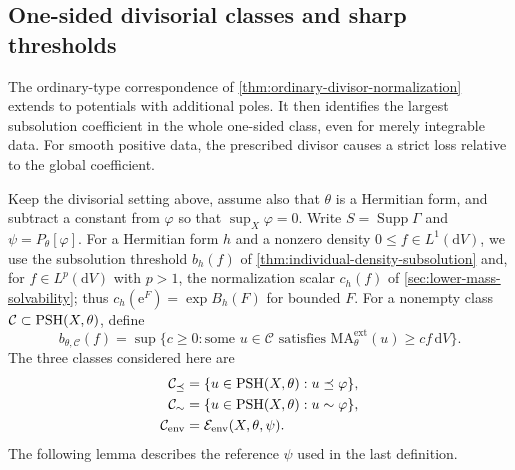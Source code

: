 \subsection{One-sided divisorial classes and sharp thresholds}
\label{subsec:divisorial-type-thresholds}

The ordinary-type correspondence of \cref{thm:ordinary-divisor-normalization} extends to potentials with additional poles. It then identifies the largest subsolution coefficient in the whole one-sided class, even for merely integrable data. For smooth positive data, the prescribed divisor causes a strict loss relative to the global coefficient.

Keep the divisorial setting above, assume also that $\theta$ is a Hermitian form, and subtract a constant from $\varphi$ so that $\sup_X\varphi=0$. Write $S=\operatorname{Supp}\Gamma$ and $\psi=P_\theta[\varphi]$. For a Hermitian form $h$ and a nonzero density $0\le f\in L^1(\mathrm dV)$, we use the subsolution threshold $b_h(f)$ of \cref{thm:individual-density-subsolution} and, for $f\in L^p(\mathrm dV)$ with $p>1$, the normalization scalar $c_h(f)$ of \cref{sec:lower-mass-solvability}; thus $c_h(\mathrm e^F)=\exp B_h(F)$ for bounded $F$. For a nonempty class $\mathcal C\subset\mathrm{PSH}(X,\theta)$, define
\[
 b_{\theta,\mathcal C}(f)=\sup\{c\ge0:\text{some }u\in\mathcal C
          \text{ satisfies }\mathrm{MA}^{\mathrm{ext}}_\theta(u)
                                      \ge cf\,\mathrm dV\}.
\]
The three classes considered here are
\[
 \begin{aligned}
 \mathcal C_{\preceq}&=\{u\in\mathrm{PSH}(X,\theta):u\preceq\varphi\},\\
 \mathcal C_{\sim}&=\{u\in\mathrm{PSH}(X,\theta):u\sim\varphi\},\\
 \mathcal C_{\mathrm{env}}&=\mathcal E_{\mathrm{env}}(X,\theta,\psi).
 \end{aligned}
\]
The following lemma describes the reference $\psi$ used in the last definition.

